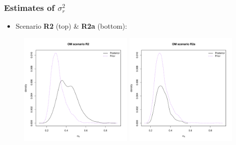 \documentclass{beamer}
\newcommand{\sigr}{\sigma^2_r}
\begin{document}
\begin{frame}
    \frametitle{Estimates of $\sigr$}
\begin{itemize}
    \item Scenario \textbf{R2} (top) \& \textbf{R2a} (bottom):
\end{itemize}
\vspace{0.25cm}
\begin{figure}
\begin{center}
       \includegraphics[width=5.5cm,height=5.5cm]{figs/pvsp_sigmar_R2.pdf} 
        \includegraphics[width=5.5cm,height=5.5cm]{figs/pvsp_sigmar_R2a.pdf} 
    \end{center}
\end{figure}
\end{frame}
\end{document}
